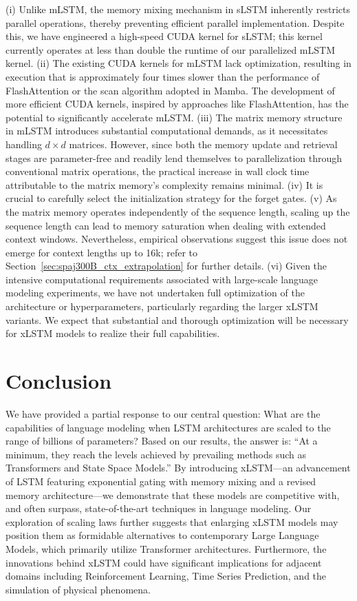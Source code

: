 (i) Unlike mLSTM, the memory mixing mechanism in sLSTM inherently restricts parallel operations, thereby preventing efficient parallel implementation. Despite this, we have engineered a high-speed CUDA kernel for sLSTM; this kernel currently operates at less than double the runtime of our parallelized mLSTM kernel. (ii) The existing CUDA kernels for mLSTM lack optimization, resulting in execution that is approximately four times slower than the performance of FlashAttention or the scan algorithm adopted in Mamba. The development of more efficient CUDA kernels, inspired by approaches like FlashAttention, has the potential to significantly accelerate mLSTM. (iii) The matrix memory structure in mLSTM introduces substantial computational demands, as it necessitates handling $d \times d$ matrices. However, since both the memory update and retrieval stages are parameter-free and readily lend themselves to parallelization through conventional matrix operations, the practical increase in wall clock time attributable to the matrix memory’s complexity remains minimal. (iv) It is crucial to carefully select the initialization strategy for the forget gates. (v) As the matrix memory operates independently of the sequence length, scaling up the sequence length can lead to memory saturation when dealing with extended context windows. Nevertheless, empirical observations suggest this issue does not emerge for context lengths up to 16k; refer to Section~\ref{sec:spaj300B_ctx_extrapolation} for further details. (vi) Given the intensive computational requirements associated with large-scale language modeling experiments, we have not undertaken full optimization of the architecture or hyperparameters, particularly regarding the larger xLSTM variants. We expect that substantial and thorough optimization will be necessary for xLSTM models to realize their full capabilities.

\section{Conclusion}
We have provided a partial response to our central question: What are the capabilities of language modeling when LSTM architectures are scaled to the range of billions of parameters? Based on our results, the answer is: ``At a minimum, they reach the levels achieved by prevailing methods such as Transformers and State Space Models.'' By introducing xLSTM—an advancement of LSTM featuring exponential gating with memory mixing and a revised memory architecture—we demonstrate that these models are competitive with, and often surpass, state-of-the-art techniques in language modeling. Our exploration of scaling laws further suggests that enlarging xLSTM models may position them as formidable alternatives to contemporary Large Language Models, which primarily utilize Transformer architectures. Furthermore, the innovations behind xLSTM could have significant implications for adjacent domains including Reinforcement Learning, Time Series Prediction, and the simulation of physical phenomena.

